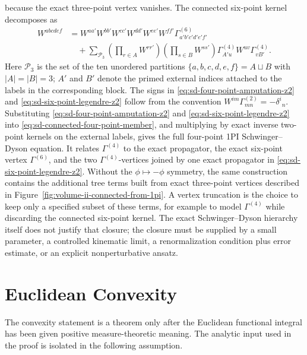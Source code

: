 because the exact three-point vertex vanishes.  The connected six-point
kernel decomposes as
\begin{equation}
\begin{aligned}
  W^{abcdef}
  &=
  W^{aa'}W^{bb'}W^{cc'}W^{dd'}W^{ee'}W^{ff'}
  \Gamma^{(6)}_{a'b'c'd'e'f'}                                      \\
  &\quad
  +
  \sum_{\mathcal P_3}
  \left(
    \prod_{r\in A}W^{rr'}
  \right)
  \left(
    \prod_{s\in B}W^{ss'}
  \right)
  \Gamma^{(4)}_{A'u}
  W^{uv}
  \Gamma^{(4)}_{vB'} .
\end{aligned}
  \label{eq:sd-six-point-legendre-z2}
\end{equation}
Here \(\mathcal P_3\) is the set of the ten unordered partitions
\(\{a,b,c,d,e,f\}=A\sqcup B\) with \(|A|=|B|=3\); \(A'\) and \(B'\) denote
the primed external indices attached to the labels in the corresponding
block.  The signs in
\eqref{eq:sd-four-point-amputation-z2} and
\eqref{eq:sd-six-point-legendre-z2} follow from the convention
\(W^{im}\Gamma^{(2)}_{mn}=-\delta^i{}_n\).  Substituting
\eqref{eq:sd-four-point-amputation-z2} and
\eqref{eq:sd-six-point-legendre-z2} into
\eqref{eq:sd-connected-four-point-member}, and multiplying by exact inverse
two-point kernels on the external labels, gives the full four-point 1PI
Schwinger--Dyson equation.  It relates \(\Gamma^{(4)}\) to the exact
propagator, the exact six-point vertex \(\Gamma^{(6)}\), and the two
\(\Gamma^{(4)}\)-vertices joined by one exact propagator in
\eqref{eq:sd-six-point-legendre-z2}.  Without the
\(\phi\mapsto-\phi\) symmetry, the same construction contains the additional
tree terms built from exact three-point vertices described in
Figure~\ref{fig:volume-ii-connected-from-1pi}.  A vertex truncation is the
choice to keep only a specified subset of these terms, for example to model
\(\Gamma^{(4)}\) while discarding the connected six-point kernel.  The exact
Schwinger--Dyson hierarchy itself does not justify that closure; the closure
must be supplied by a small parameter, a controlled kinematic limit, a
renormalization condition plus error estimate, or an explicit nonperturbative
ansatz.

\section{Euclidean Convexity}

The convexity statement is a theorem only after the Euclidean functional
integral has been given positive measure-theoretic meaning.  The analytic input
used in the proof is isolated in the following assumption.

